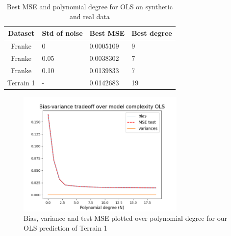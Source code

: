 \documentclass[twocolumn,10pt,cleanfoot]{asme2ej}
\begin{document}
\begin{table}[t]
\caption{Best MSE and polynomial degree for OLS on synthetic and real data}
\begin{center}
\label{ols_mse_table_dif_data}
\begin{tabular}{c l l l}
Dataset & Std of noise & Best MSE & Best degree \\
\hline
Franke & 0 & 0.0005109 & 9\\
Franke & 0.05 & 0.0038302 & 7 \\
Franke & 0.10 & 0.0139833 & 7 \\
Terrain 1 & - & 0.0142683 & 19 \\
\hline
\end{tabular}
\end{center}
\end{table}

\begin{figure} 
\centerline{\includegraphics[width=3.25in]{figure/realbiasvarianceOLS.png}}
\caption{Bias, variance and test MSE plotted over polynomial degree for our OLS prediction of Terrain 1}
\label{realbiasvarianceOLS}
\end{figure}
\end{document}
